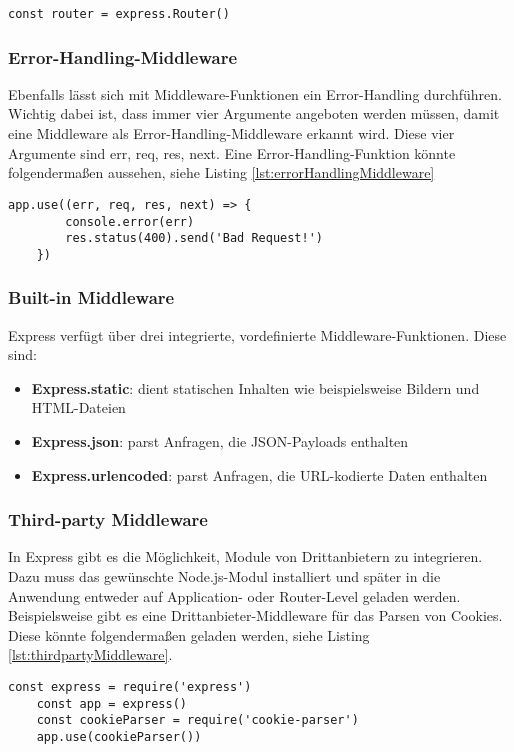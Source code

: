 \begin{lstlisting}[caption={Verwendung der Instanz}, label={lst:verwendungInstanz}]
    const router = express.Router()
\end{lstlisting}

\subsubsection{Error-Handling-Middleware}

Ebenfalls lässt sich mit Middleware-Funktionen ein Error-Handling durchführen. Wichtig dabei ist, dass immer vier Argumente angeboten werden müssen, damit eine Middleware als Error-Handling-Middleware erkannt wird. Diese vier Argumente sind \grqq err, req, res, next\glqq{}. 
Eine Error-Handling-Funktion könnte folgendermaßen aussehen, siehe Listing \ref*{lst:errorHandlingMiddleware}

\begin{lstlisting}[caption={Error-Handling-Middleware}, label={lst:errorHandlingMiddleware}]
    app.use((err, req, res, next) => {
	    console.error(err)
	    res.status(400).send('Bad Request!')
    })
\end{lstlisting}


\subsubsection{Built-in Middleware}

Express verfügt über drei integrierte, vordefinierte Middleware-Funktionen. Diese sind:
\begin{itemize}
    \item \textbf{Express.static}: dient statischen Inhalten wie beispielsweise Bildern und HTML-Dateien
    \item \textbf{Express.json}: parst Anfragen, die JSON-Payloads enthalten
    \item \textbf{Express.urlencoded}: parst Anfragen, die URL-kodierte Daten enthalten
\end{itemize}

\subsubsection{Third-party Middleware}

In Express gibt es die Möglichkeit, Module von Drittanbietern zu integrieren. Dazu muss das gewünschte Node.js-Modul installiert und später in die Anwendung entweder auf Application- oder Router-Level geladen werden. Beispielsweise gibt es eine Drittanbieter-Middleware für das Parsen von Cookies. Diese könnte folgendermaßen geladen werden, siehe Listing \ref*{lst:thirdpartyMiddleware}.

\begin{lstlisting}[caption={Module von Drittanbietern integrieren \cite{nsechs}}, label={lst:thirdpartyMiddleware}]
    const express = require('express')
    const app = express()
    const cookieParser = require('cookie-parser')
    app.use(cookieParser())
\end{lstlisting}


